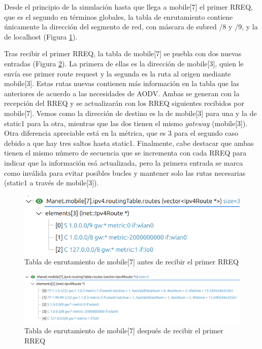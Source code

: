 Desde el principio de la simulación hasta que llega a mobile[7] el primer RREQ, que es el segundo en términos globales, la tabla de enrutamiento contiene únicamente la dirección del segmento de red, con máscara de subred /8 y /9, y la de localhost (Figura \ref{fig:rtable_prev_mob7}).

Tras recibir el primer RREQ, la tabla de mobile[7] se puebla con dos nuevas entradas (Figura \ref{fig:rtable_post_mob7}). La primera de ellas es la dirección de mobile[3], quien le envía ese primer route request y la segunda es la ruta al origen mediante mobile[3]. Estas rutas nuevas contienen más información en la tabla que las anteriores de acuerdo a las necesidades de AODV. Ambas se generan con la recepción del RREQ y se actualizarán con los RREQ siguientes recibidos por mobile[7]. Vemos como la dirección de destino es la de mobile[3] para una y la de static1 para la otra, mientras que las dos tienen el mismo \textit{gateway} (mobile[3]). Otra diferencia apreciable está en la métrica, que es 3 para el segundo caso debido a que hay tres saltos hasta static1. Finalmente, cabe destacar que ambas tienen el mismo número de secuencia que se incrementa con cada RREQ para indicar que la información esá actualizada, pero la primera entrada se marca como inválida para evitar posibles bucles y mantener solo las rutas necesarias (static1 a través de mobile[3]).

\begin{figure}[H]
    \centering
    \includegraphics[width=125mm, scale=0.75]{imaxes/aodv/ejercicio2_1.png}
    \caption{Tabla de enrutamiento de mobile[7] antes de recibir el primer RREQ}
    \label{fig:rtable_prev_mob7}
\end{figure}

\begin{figure}[H]
    \centering
    \includegraphics[width=125mm, scale=0.75]{imaxes/aodv/ejercicio2_2.png}
    \caption{Tabla de enrutamiento de mobile[7] después de recibir el primer RREQ}
    \label{fig:rtable_post_mob7}
\end{figure}

